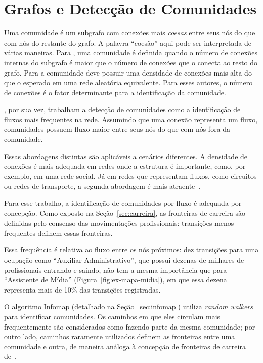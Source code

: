 \documentclass[
  article,
  11pt,
  a4paper,
  english,
  brazil,
  sumario=tradicional]{abntex2}
\begin{document}
\section{Grafos e Detecção de Comunidades} \label{sec:comunidades}

Uma comunidade é um subgrafo com conexões mais \textit{coesas} entre seus nós do que com nós do restante do grafo. A palavra \enquote{coesão} aqui pode ser interpretada de várias maneiras. Para , uma comunidade é definida quando o número de conexões internas do subgrafo é maior que o número de conexões que o conecta ao resto do grafo. Para  a comunidade deve possuir uma densidade de conexões mais alta do que o esperado em uma rede aleatória equivalente. Para esses autores, o número de conexões é o fator determinante para a identificação da comunidade.

, por sua vez, trabalham a detecção de comunidades como a identificação de fluxos mais frequentes na rede. Assumindo que uma conexão representa um fluxo, comunidades possuem fluxo maior entre seus nós do que com nós fora da comunidade.

Essas abordagens distintas são aplicáveis a cenários diferentes. A densidade de conexões é mais adequada em redes onde a estrutura é importante, como, por exemplo, em uma rede social. Já em redes que representam fluxos, como circuitos ou redes de transporte, a segunda abordagem é mais atraente~\cite{Rosvall2009-sd}.

Para esse trabalho, a identificação de comunidades por fluxo é adequada por concepção. Como exposto na Seção~\ref{sec:carreira}, as fronteiras de carreira são definidas pelo consenso das movimentações profissionais: transições menos frequentes definem essas fronteiras.

Essa frequência é relativa ao fluxo entre os nós próximos: dez transições para uma ocupação como \enquote{Auxiliar Administrativo}, que possui dezenas de milhares de profissionais entrando e saindo, não tem a mesma importância que para \enquote{Assistente de Mídia} (Figura~\ref{fig:ex-mapa-midia}), em que essa dezena representa mais de 10\% das transições registradas.

O algoritmo Infomap (detalhado na Seção~\ref{sec:infomap}) utiliza \textit{random walkers} para identificar comunidades. Os caminhos em que eles circulam mais frequentemente são considerados como fazendo parte da mesma comunidade; por outro lado, caminhos raramente utilizados definem as fronteiras entre uma comunidade e outra, de maneira análoga à concepção de fronteiras de carreira de~.
\end{document}
